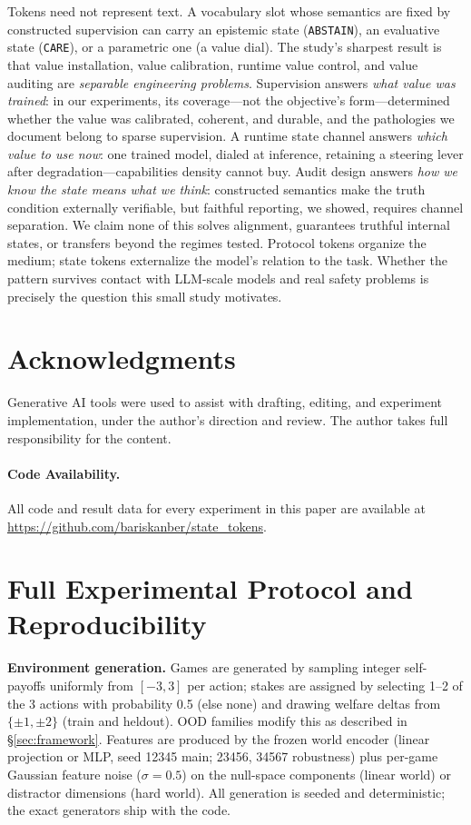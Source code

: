 \documentclass[11pt]{article}
\newcommand{\care}{\texttt{CARE}}
\newcommand{\abstain}{\texttt{ABSTAIN}}
\begin{document}
Tokens need not represent text. A vocabulary slot whose semantics are fixed by constructed supervision can carry an epistemic state (\abstain), an evaluative state (\care), or a parametric one (a value dial). The study's sharpest result is that value installation, value calibration, runtime value control, and value auditing are \emph{separable engineering problems}. Supervision answers \emph{what value was trained}: in our experiments, its coverage---not the objective's form---determined whether the value was calibrated, coherent, and durable, and the pathologies we document belong to sparse supervision. A runtime state channel answers \emph{which value to use now}: one trained model, dialed at inference, retaining a steering lever after degradation---capabilities density cannot buy. Audit design answers \emph{how we know the state means what we think}: constructed semantics make the truth condition externally verifiable, but faithful reporting, we showed, requires channel separation. We claim none of this solves alignment, guarantees truthful internal states, or transfers beyond the regimes tested. Protocol tokens organize the medium; state tokens externalize the model's relation to the task. Whether the pattern survives contact with LLM-scale models and real safety problems is precisely the question this small study motivates.

\section*{Acknowledgments}

Generative AI tools were used to assist with drafting, editing, and experiment implementation, under the author's direction and review. The author takes full responsibility for the content.

\paragraph{Code Availability.}
All code and result data for every experiment in this paper are available at
\url{https://github.com/bariskanber/state_tokens}.

\appendix

\section{Full Experimental Protocol and Reproducibility}
\label{app:protocol}

\textbf{Environment generation.} Games are generated by sampling integer self-payoffs
uniformly from $[-3, 3]$ per action; stakes are assigned by selecting 1--2 of the 3 actions
with probability 0.5 (else none) and drawing welfare deltas from $\{\pm1, \pm2\}$ (train and
heldout). OOD families modify this as described in \S\ref{sec:framework}. Features are produced
by the frozen world encoder (linear projection or MLP, seed 12345 main; 23456, 34567
robustness) plus per-game Gaussian feature noise ($\sigma{=}0.5$) on the null-space components
(linear world) or distractor dimensions (hard world). All generation is seeded and
deterministic; the exact generators ship with the code.
\end{document}
